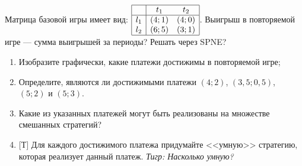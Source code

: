 \begin{problem}
Матрица базовой игры имеет вид:  $\begin{array}{|c|cc|}  \hline {} & {t_{1} } & {t_{2} } \\  \hline {l_{1} } & {\left(4;1\right)} & {\left(4;0\right)} \\ {l_{2} } & {\left(6;5\right)} & {\left(3;1\right)} \\  \hline  \end{array}$. {\red Выигрыш в повторяемой игре --- сумма выигрышей за периоды? Решать через SPNE?}
\begin{enumerate}
\item       Изобразите графически, какие платежи достижимы в повторяемой игре;

\item      Определите, являются ли достижимыми платежи  $\left(4;2\right)$,  $\left(3,5;0,5\right)$,  $\left(5;2\right)$  и  $\left(5;3\right)$.

\item       Какие из указанных платежей могут быть реализованы на множестве смешанных стратегий?

\item $[$Т$]$ Для каждого достижимого платежа придумайте <<умную>> стратегию, которая реализует данный платеж. {\it Тигр: Насколько умную?}
\end{enumerate}


\begin{sol}

\end{sol}
\end{problem}




